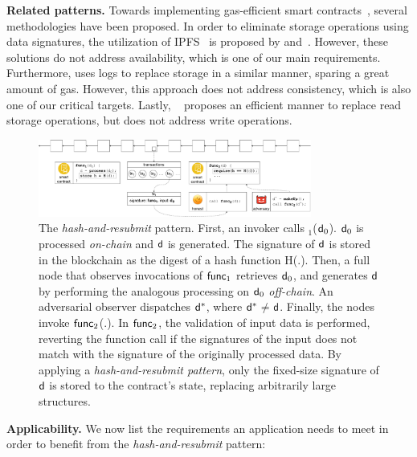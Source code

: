 \noindent \textbf{Related patterns.} Towards implementing gas-efficient smart
contracts~\cite{contract-opt-1, contract-opt-2, slither, madmax}, several
methodologies have been proposed. In order to eliminate storage operations
using data signatures, the utilization of IPFS~\cite{ipfs} is proposed by
\cite{ipfs-1} and~\cite{ipfs-2}. However, these solutions do not address
availability, which is one of our main requirements. Furthermore,
\cite{logs} uses logs to replace storage in a similar manner, sparing a great
amount of gas. However, this approach does not address consistency, which is
also one of our critical targets. Lastly, ~\cite{memory-array} proposes an
efficient manner to replace read storage operations, but does not address write
operations.


\begin{figure}[h]
    \begin{center} \includegraphics[width=0.8\textwidth]{figures/har-pattern.pdf}
    \end{center}

    \caption{The \emph{hash-and-resubmit} pattern. First, an invoker calls
        \proc$_1$($\mathsf{d}_0$). $\mathsf{d}_0$ is processed \emph{on-chain} and
        $\mathsf{d}$ is generated. The signature of $\mathsf{d}$ is stored in the
        blockchain as the digest of a hash function \textsf{H}(.). Then,
        a full node that observes invocations of $\textsf{func}_1$ retrieves $\mathsf{d}_0$,
        and generates $\mathsf{d}$ by performing the analogous processing on
        $\mathsf{d}_0$ \emph{off-chain}. An adversarial observer dispatches
        $\mathsf{d^*}$, where $\mathsf{d^*}$$\neq$$\mathsf{d}$. Finally, the nodes invoke
        $\textsf{func}_2$(.). In $\textsf{func}_2$, the validation of input data is performed,
        reverting the function call if the signatures of the input does not
        match with the signature of the originally processed data. By applying
        a \emph{hash-and-resubmit pattern}, only the fixed-size signature of
        $\mathsf{d}$ is stored to the contract's state, replacing arbitrarily large
        structures.}

        \label{fig:har-pattern}
\end{figure}

\noindent
\textbf{Applicability.}
We now list the requirements an application needs to meet in order to benefit
from the \emph{hash-and-resubmit} pattern:

